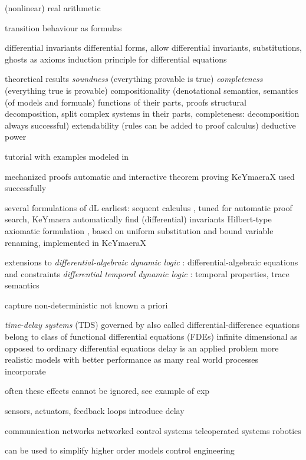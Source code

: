     (nonlinear) real arithmetic

    transition behaviour as formulas

    differential invariants
    differential forms, allow differential invariants, substitutions, ghosts as axioms
    induction principle for differential equations

    theoretical results
    \emph{soundness} (everything provable is true)
    \emph{completeness} (everything true is provable)
    compositionality (denotational semantics, semantics (of models and formuals) functions of their parts, proofs structural decomposition, split complex systems in their parts, completeness: decomposition always successful)
    extendability (rules can be added to proof calculus)
    deductive power

	tutorial with examples modeled in \dL
	\cite{Quesel16Tutorial}

	mechanized proofs
	automatic and interactive theorem proving
	KeYmaeraX
    used successfully

	several formulations of dL
	earliest: sequent calculus \cite{Platzer10HybridSystems}, tuned for automatic proof search, KeYmaera
    automatically find (differential) invariants
	Hilbert-type axiomatic formulation \cite{Platzer15Uniform}, based on uniform substitution and bound variable renaming, implemented in KeYmaeraX

    extensions to \dL
    \emph{differential-algebraic dynamic logic} \DAL: differential-algebraic equations and constraints
    \emph{differential temporal dynamic logic} \dTL: temporal properties, trace semantics


	capture non-deterministic
	not known a priori


    \cite{Richard2003TDSs}
    \emph{time-delay systems} (TDS)
    governed by
    also called differential-difference equations
    belong to class of functional differential equations (FDEs)
    infinite dimensional
    as opposed to ordinary differential equations
    delay is an applied problem
    more realistic models with better performance
    as many real world processes incorporate

    often these effects cannot be ignored, see example of exp

    sensors, actuators, feedback loops
    introduce delay

    communication networks
    networked control systems
    teleoperated systems
    robotics

    can be used to simplify higher order models
    control engineering

